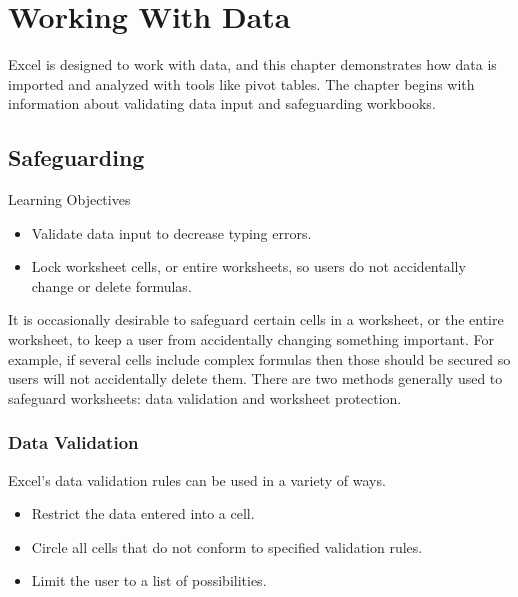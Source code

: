 \chapter{Working With Data}\label{ch07:data}

Excel is designed to work with data, and this chapter demonstrates how data is imported and analyzed with tools like pivot tables. The chapter begins with information about validating data input and safeguarding workbooks. 

\section{Safeguarding}

\begin{center}
	\begin{objbox}{Learning Objectives}
		\begin{itemize}
			\setlength{\itemsep}{0pt}
			\setlength{\parskip}{0pt}
			\setlength{\parsep}{0pt}
			
			\item Validate data input to decrease typing errors.
			\item Lock worksheet cells, or entire worksheets, so users do not accidentally change or delete formulas.
			
		\end{itemize}
	\end{objbox}
\end{center}

It is occasionally desirable to safeguard certain cells in a worksheet, or the entire worksheet, to keep a user from accidentally changing something important. For example, if several cells include complex formulas then those should be secured so users will not accidentally delete them. There are two methods generally used to safeguard worksheets: data validation and worksheet protection. 

\subsection{Data Validation}

Excel's data validation rules can be used in a variety of ways.

\begin{itemize}
	\item Restrict the data entered into a cell.
	\item Circle all cells that do not conform to specified validation rules.
	\item Limit the user to a list of possibilities.
\end{itemize}

